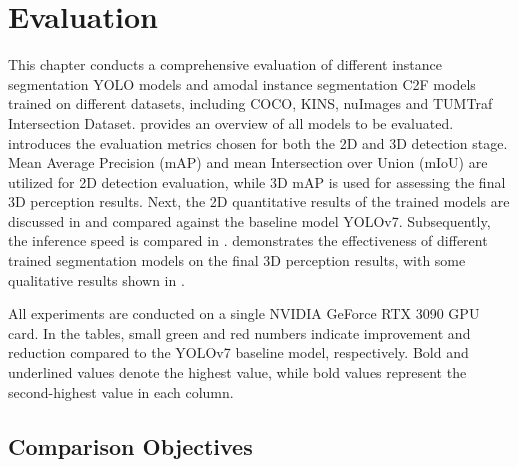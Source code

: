\chapter{Evaluation}  \label{chap:five}

This chapter conducts a comprehensive evaluation of different instance segmentation YOLO models and amodal instance segmentation C2F models trained on different datasets, including COCO, KINS, nuImages and TUMTraf Intersection Dataset.  provides an overview of all models to be evaluated.   introduces the evaluation metrics chosen for both the 2D and 3D detection stage. Mean Average Precision (mAP) and mean Intersection over Union (mIoU)  are utilized for 2D detection evaluation, while 3D mAP is used for assessing the final 3D perception results. Next, the 2D quantitative results of the trained models are discussed in  and compared against the baseline model YOLOv7. Subsequently, the inference speed is compared in .  demonstrates the effectiveness of different trained segmentation models on the final 3D perception results, with some qualitative results shown in . 

All experiments are conducted on a single NVIDIA GeForce RTX 3090 GPU card. In the tables, small green and red numbers indicate improvement and reduction compared to the YOLOv7 baseline model, respectively. Bold and underlined values denote the highest value, while bold values represent the second-highest value in each column.

\section{Comparison Objectives} \label{sec:comparison objectives}

